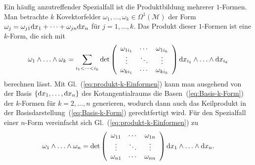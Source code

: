 Ein häufig anzutreffender Spezialfall ist die Produktbildung mehrerer
$1$-Formen. Man betrachte $k$ Kovektorfelder $\omega_{1},\ldots,\omega_{k}\in\Omega^{1}(\mathcal{M})$
der Form $\omega_{j}=\omega_{j1}{\mathrm{d}} x_{1}+\cdots+\omega_{jn}{\mathrm{d}} x_{n}$
für $j=1,\ldots,k$. Das Produkt dieser $1$-Formen ist eine $k$-Form,
die sich mit 
\begin{equation}
\omega_{1}\wedge\ldots\wedge\omega_{k}=\sum_{i_{1}<\cdots<i_{k}}\det\left(\begin{array}{ccc}
\omega_{1i_{1}} & \cdots & \omega_{1i_{k}}\\
\vdots & \ddots & \vdots\\
\omega_{ki_{1}} & \cdots & \omega_{ki_{k}}
\end{array}\right){\mathrm{d}} x_{i_{1}}\wedge\ldots\wedge{\mathrm{d}} x_{i_{k}}\label{eq:produkt-k-Einformen}
\end{equation}
berechnen lässt. Mit Gl.~(\ref{eq:produkt-k-Einformen}) kann man
ausgehend von der Basis $\left\{ {\mathrm{d}} x_{1},\ldots,{\mathrm{d}} x_{n}\right\} $
des Kotangential\-raums die Basen~(\ref{eq:Basis-k-Form}) der $k$-Formen
für $k=2,\ldots,n$ generieren, wodurch dann auch das Keilprodukt
in der Basis\-darstellung~(\ref{eq:Basis-k-Form}) gerechtfertigt
wird. Für den Spezialfall einer $n$-Form vereinfacht sich Gl.~(\ref{eq:produkt-k-Einformen})
zu
\begin{equation}
\omega_{1}\wedge\ldots\wedge\omega_{n}=\det\left(\begin{array}{ccc}
\omega_{11} & \cdots & \omega_{1n}\\
\vdots & \ddots & \vdots\\
\omega_{n1} & \cdots & \omega_{nn}
\end{array}\right){\mathrm{d}} x_{1}\wedge\ldots\wedge{\mathrm{d}} x_{n}.\label{eq:produkt-n-Einformen}
\end{equation}

